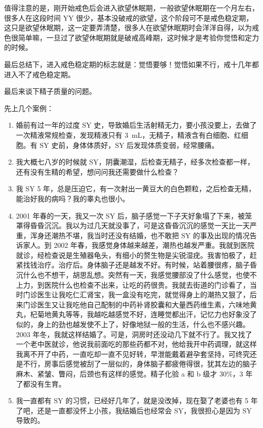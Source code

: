\documentclass{ctexart}
\begin{document}
值得注意的是，刚开始戒色后会进入欲望休眠期，一般欲望休眠期在一个月左右，很多人在这段时间 YY 很少，基本没破戒的欲望，这个阶段可不是戒色稳定期，这只是欲望休眠期，这一定要弄清楚，很多人在欲望休眠期时会洋洋自得，以为戒色很简单嘛，一旦过了欲望休眠期就是破戒高峰期，这时候才是考验你觉悟和定力的时候。

最后总结下，进入戒色稳定期的标志就是：觉悟要够！觉悟如果不行，戒十几年都进入不了戒色稳定期。

最后来谈下精子质量的问题。

先上几个案例：

\begin{enumerate}
    \item 婚前有过一年的过度 SY 史，导致婚后生活射精无力，要小孩没要上，去做了一次精液常规检查，发现精液只有 \SI{3}{\milli\liter}，无精子，精液含有白细胞、红细胞。有 SY 史前，身体体质好，SY 后发现体质变弱，经常腰痛。
    \item 我大概七八岁的时候就 SY，阴囊潮湿，后检查无精子，经多次检查都一样，还有没有生精的希望，想问问我还需要做什么检查？
    \item 我 SY 5 年，总是压迫它，有一次射出一黄豆大的白色颗粒，之后检查无精，能治好我的病吗？我的睾丸也很小。
    \item 2001 年春的一天，我又一次 SY 后，脑子感觉一下子天好象塌了下来，被笼罩得昏昏沉沉。我以为过几天就没事了，可是这昏昏沉沉的感觉一天比一天严重，浑身还潮热不堪，我当时还没有结婚，也不敢把 SY 的事及出现的情况告诉家人。到 2002 年春，我感觉身体越来越差，潮热也越发严重。我就到医院就诊，经检查说是生殖器龟头，有细小的赘生物是尖锐湿疣。我害怕极了，赶紧找钱治疗。治疗后。身体脑子还是越发不好。有时候，站着腰很疼，脑子昏沉什么也不想干，胡思乱想。突然有一天，我感觉腰部没了什么感觉，也使不上力，到医院什么也检查不出来，让吃的药很贵。我就去街道的门诊看了，当时门诊医生让我吃仁汇肾宝，我一盒没有吃完，就觉得身上的潮热又狠了，后来门诊医生又让我吃他自己配制的中药补肾胶囊和大量西药维生素，六味地黄丸，杞菊地黄丸等等，我越吃越感觉不好，连睡觉都出汗，记忆力也好象没了似的，身上的劲也越发使不上了，好像地狱一般的生活，什么也不感兴趣。2003 年冬，我就这样结婚了。可是，洞房时还没动几下就不行了。我又找了一个老中医就诊，他说我前面吃的那些药都不对，他给我开中药调理，就这样我离不开了中药，一直吃却一直不见好转，早泄能戴着避孕套坚持，可终究还是不行，房事后感觉被刮了一层似的，身体脑子都疲倦得很，犹其左边的脑子麻木、紧皱、瞥闷，后颈也有这样的感觉。精子化验 a 和 b 级才 30\%，3 年了都没有生育。
    \item 我一直都有 SY 的习惯，已经好几年了，就是没改掉，现在娶了老婆也有 5 年了吧，还是一直都没怀上小孩，我结婚后也经常会 SY，我很担心是因为 SY 导致的。

\end{enumerate}
\end{document}
